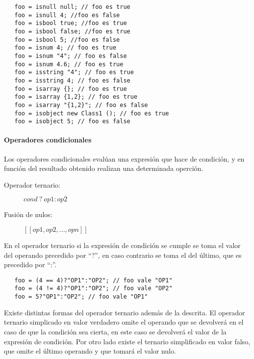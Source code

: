 \begin{lstlisting}
   foo = isnull null; // foo es true
   foo = isnull 4; //foo es false
   foo = isbool true; //foo es true
   foo = isbool false; //foo es true
   foo = isbool 5; //foo es false
   foo = isnum 4; // foo es true
   foo = isnum "4"; // foo es false
   foo = isnum 4.6; // foo es true
   foo = isstring "4"; // foo es true
   foo = isstring 4; // foo es false
   foo = isarray {}; // foo es true
   foo = isarray {1,2}; // foo es true 
   foo = isarray "{1,2}"; // foo es false
   foo = isobject new Class1 (); // foo es true
   foo = isobject 5; // foo es false 
\end{lstlisting} 


\paragraph{Operadores condicionales} \label{sec:op_cond}

Los operadores condicionales evalúan una expresión que hace de condición, y en función del resultado obtenido realizan una determinada operción.

\begin{description}
\item [Operador ternario:] $cond\ ?\ op1:op2$
\item [Fusión de nulos:] $[[ op1, op2,...,opn ]]$
\end{description} 


En el operador ternario si la expresión de condición se cumple se toma el valor del operando precedido por ``?'', en caso contrario se toma el del último, que es precedido por ``:''. \\

\begin{lstlisting}
   foo = (4 == 4)?"OP1":"OP2"; // foo vale "OP1"
   foo = (4 != 4)?"OP1":"OP2"; // foo vale "OP2"
   foo = 5?"OP1":"OP2"; // foo vale "OP1"
\end{lstlisting} 

Existe distintas formas del operador ternario además de la descrita. El operador ternario simplicado en valor verdadero omite el operando que se devolverá en el caso de que la condición 
sea cierta, en este caso se devolverá el valor de la expresión de condición. Por otro lado existe el ternario simplificado en valor falso, que omite el último operando
y que tomará el valor nulo. \\

